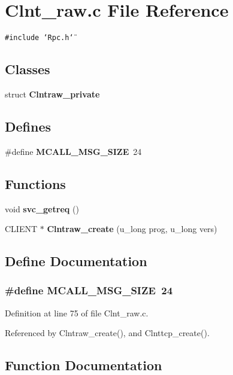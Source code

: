 \section{Clnt\_\-raw.c File Reference}
\label{Clnt__raw_8c}
{\tt \#include \char`\"{}Rpc.h\char`\"{}}\par
\subsection*{Classes}
\begin{CompactItemize}
\item 
struct {\bf Clntraw\_\-private}
\end{CompactItemize}
\subsection*{Defines}
\begin{CompactItemize}
\item 
\#define {\bf MCALL\_\-MSG\_\-SIZE}\ 24
\end{CompactItemize}
\subsection*{Functions}
\begin{CompactItemize}
\item 
void {\bf svc\_\-getreq} ()
\item 
CLIENT $\ast$ {\bf Clntraw\_\-create} (u\_\-long prog, u\_\-long vers)
\end{CompactItemize}


\subsection{Define Documentation}
\subsubsection{\setlength{\rightskip}{0pt plus 5cm}\#define MCALL\_\-MSG\_\-SIZE\ 24}\label{Clnt__raw_8c_a0}




Definition at line 75 of file Clnt\_\-raw.c.

Referenced by Clntraw\_\-create(), and Clnttcp\_\-create().

\subsection{Function Documentation}
